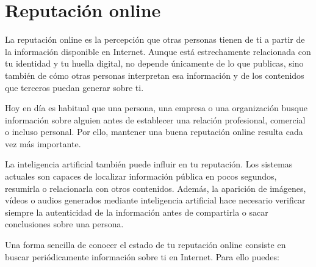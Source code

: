 \documentclass[
  spanish,
  a4paper,
  openany]{book}
\begin{document}
\section{Reputación online}\label{reputaciuxf3n-online}

La reputación online es la percepción que otras personas tienen de ti a partir de la información disponible en Internet. Aunque está estrechamente relacionada con tu identidad y tu huella digital, no depende únicamente de lo que publicas, sino también de cómo otras personas interpretan esa información y de los contenidos que terceros puedan generar sobre ti.

Hoy en día es habitual que una persona, una empresa o una organización busque información sobre alguien antes de establecer una relación profesional, comercial o incluso personal. Por ello, mantener una buena reputación online resulta cada vez más importante.

La inteligencia artificial también puede influir en tu reputación. Los sistemas actuales son capaces de localizar información pública en pocos segundos, resumirla o relacionarla con otros contenidos. Además, la aparición de imágenes, vídeos o audios generados mediante inteligencia artificial hace necesario verificar siempre la autenticidad de la información antes de compartirla o sacar conclusiones sobre una persona.

Una forma sencilla de conocer el estado de tu reputación online consiste en buscar periódicamente información sobre ti en Internet. Para ello puedes:
\end{document}
